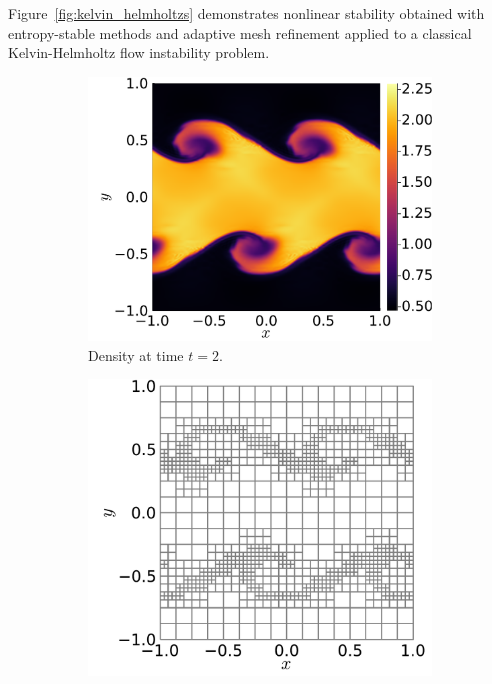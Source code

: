 \documentclass[hidelinks]{juliacon} %
\begin{document}
Figure~\ref{fig:kelvin_helmholtzs} demonstrates nonlinear stability
obtained with entropy-stable methods and adaptive mesh refinement applied to a
classical Kelvin-Helmholtz flow instability problem.
\begin{figure}[!h]
  \begin{subfigure}{0.52\linewidth}
    \includegraphics[width=\textwidth]{../figures/kelvin_helmholtz_density_t2}
    \caption{Density at time $t = 2$.}
  \end{subfigure}%
  \hspace*{\fill}
  \begin{subfigure}{0.46\linewidth}
    \includegraphics[width=\textwidth]{../figures/kelvin_helmholtz_mesh_t2}

\end{subfigure}
\end{figure}
\end{document}
